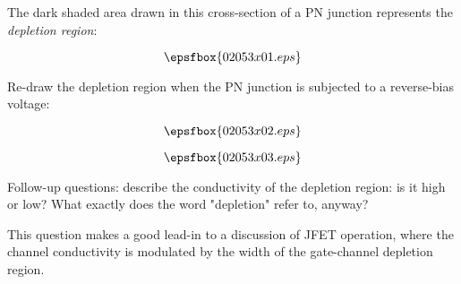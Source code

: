 

The dark shaded area drawn in this cross-section of a PN junction represents the {\it depletion region}:

$$\epsfbox{02053x01.eps}$$

Re-draw the depletion region when the PN junction is subjected to a reverse-bias voltage:

$$\epsfbox{02053x02.eps}$$







$$\epsfbox{02053x03.eps}$$

Follow-up questions: describe the conductivity of the depletion region: is it high or low?  What exactly does the word "depletion" refer to, anyway?







This question makes a good lead-in to a discussion of JFET operation, where the channel conductivity is modulated by the width of the gate-channel depletion region.





